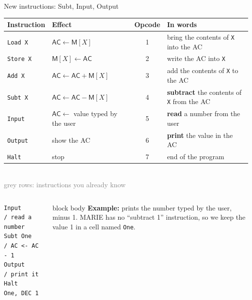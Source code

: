 \documentclass[aspectratio=169,10pt]{beamer}
\begin{document}
\begin{frame}[fragile]{New instructions: Subt, Input, Output}
  \begin{center}
    \scriptsize
    \renewcommand{\arraystretch}{1.08}
    \begin{tabular}{llcl}
      \toprule
      \textbf{Instruction} & \textbf{Effect} & \textbf{Opcode} & \textbf{In words} \\
      \midrule
      \rowcolor{LightGray}\texttt{Load X}  & $\mathsf{AC}\leftarrow\mathsf{M}[X]$ & 1 & bring the contents of \texttt{X} into the AC \\
      \rowcolor{LightGray}\texttt{Store X} & $\mathsf{M}[X]\leftarrow\mathsf{AC}$ & 2 & write the AC into \texttt{X} \\
      \rowcolor{LightGray}\texttt{Add X}   & $\mathsf{AC}\leftarrow\mathsf{AC}+\mathsf{M}[X]$ & 3 & add the contents of \texttt{X} to the AC \\
      \texttt{Subt X}  & $\mathsf{AC}\leftarrow\mathsf{AC}-\mathsf{M}[X]$ & 4 & \textbf{subtract} the contents of \texttt{X} from the AC \\
      \texttt{Input}   & $\mathsf{AC}\leftarrow$ value typed by the user & 5 & \textbf{read} a number from the user \\
      \texttt{Output}  & show the AC & 6 & \textbf{print} the value in the AC \\
      \rowcolor{LightGray}\texttt{Halt}    & stop & 7 & end of the program \\
      \bottomrule
    \end{tabular}\\[0.05cm]
    \scriptsize\textcolor{gray}{grey rows: instructions you already know}
  \end{center}
  \vspace{0.05cm}
  \begin{columns}[T,onlytextwidth]
\begin{lstlisting}[style=marie]
Input      / read a number
Subt One   / AC <- AC - 1
Output     / print it
Halt
One, DEC 1
\end{lstlisting}
      \begin{beamercolorbox}[rounded=true,sep=0.1cm,wd=\linewidth]{block body}
        \footnotesize
        \textbf{Example:} prints the number typed by the user, minus 1.
        MARIE has no ``subtract 1'' instruction, so we keep the value 1 in a cell named \texttt{One}.
      \end{beamercolorbox}
  \end{columns}
\end{frame}
\end{document}
